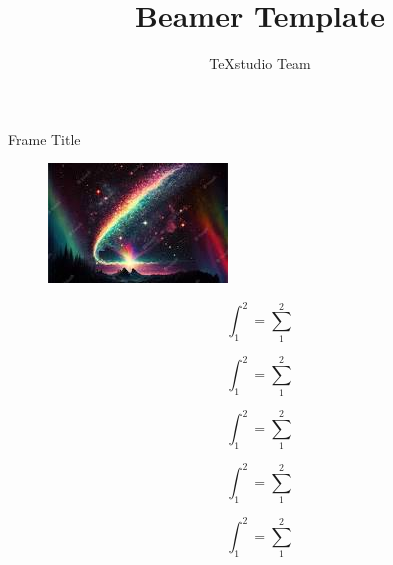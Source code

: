 \textsf{}\documentclass{beamer}
\title{Beamer Template}
\author{TeXstudio Team}
\begin{document}
\begin{frame}[plain]
    \maketitle
\end{frame}
\begin{frame}{Frame Title}
\begin{figure}
	\centering
	\includegraphics[width=0.7\linewidth]{screenshot001}
	\caption{}
	\label{fig:screenshot001}
\end{figure}

\end{frame}
\begin{frame}
	\begin{equation}\label{key}
		\int_{1}^{2}=\sum_{1}^{2}
	\end{equation}
\end{frame}
\begin{frame}
	\begin{equation}\label{key}
		\int_{1}^{2}=\sum_{1}^{2}
	\end{equation}
\end{frame}
\begin{frame}
	\begin{equation}\label{key}
		\int_{1}^{2}=\sum_{1}^{2}
	\end{equation}
\end{frame}
\begin{frame}
	\begin{equation}\label{key}
		\int_{1}^{2}=\sum_{1}^{2}
	\end{equation}
\end{frame}
\begin{frame}
	\begin{equation}\label{key}
		\int_{1}^{2}=\sum_{1}^{2}
	\end{equation}
\end{frame}
\end{document}
